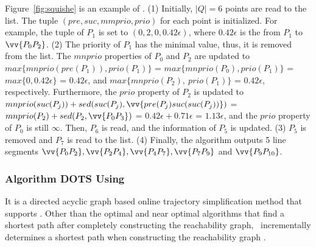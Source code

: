 \begin{example}
	\label{exm-alg-squishe}
	Figure~\ref{fig:squishe} is an example of \squishe.
	(1) Initially, $|Q| = 6$ points are read to the list. The tuple $(pre, suc, mmprio, prio)$ for each point is initialized. For example, the tuple of $P_1$ is set to $(0, 2, 0, 0.42\epsilon)$, where $0.42\epsilon$ is the \sed from $P_1$ to $\vv{P_0P_2}$.
	(2) The priority of $P_1$ has the minimal value, thus, it is removed from the list.
	The $mnprio$ properties of $P_0$ and $P_2$ are updated to $max\{mnprio(pre(P_1)), prio(P_1)\}$ = $max\{mnprio(P_0), prio(P_1)\}$ = $max\{0, 0.42\epsilon\}$ = $0.42\epsilon$, and $max\{mnprio(P_2), ~prio(P_1)\}$ = $0.42\epsilon$, respectively.
	Furthermore, the $prio$ property of $P_2$ is updated to $mnprio(suc(P_j)) + sed(suc(P_j),\vv{pre(P_{j})suc(suc(P_{j}))})$ = $mnprio(P_2) + sed(P_2,\vv{P_0P_3})$ = $0.42\epsilon + 0.71\epsilon$ = $1.13\epsilon$, and the $prio$ property of $P_0$ is still $\infty$.
	Then, $P_6$ is read, and the information of $P_5$ is updated.
	(3) $P_5$ is removed and $P_7$ is read to the list.
	(4) {Finally, the algorithm outputs 5 line segments $\vv{P_0P_2},\vv{P_2P_4},\vv{P_4P_7},\vv{P_7P_9}$ and $\vv{P_9P_{10}}$}.
\end{example}

\subsubsection{{Algorithm DOTS Using \lissed~\cite{Cao:Dots}}}
{It is a directed acyclic graph based online trajectory simplification method that supports \lissed. Other than the optimal and near optimal algorithms \cite{Chen:Fast,Daescu:metric} that find a shortest path after completely constructing the reachability graph, \dagots~incrementally determines a shortest path when constructing the reachability graph \cite{Cao:Dots}.}

